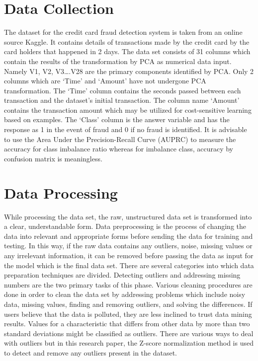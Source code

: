 \section{Data Collection}
The dataset for the credit card fraud detection system is taken from an online source Kaggle. It contains details of transactions made by the credit card by the card holders that happened in 2 days. The data set consists of 31 columns which contain the results of the transformation by PCA as numerical data input. Namely V1, V2, V3….V28 are the primary components identified by PCA. Only 2 columns which are ‘Time’ and ‘Amount’ have not undergone PCA transformation. The ‘Time’ column contains the seconds passed between each transaction and the dataset’s initial transaction. The column name ‘Amount’ contains the transaction amount which may be utilized for cost-sensitive learning based on examples. The ‘Class’ column is the answer variable and has the response as 1 in the event of fraud and 0 if no fraud is identified. It is advisable to use the Area Under the Precision-Recall Curve (AUPRC) to measure the accuracy for class imbalance ratio whereas for imbalance class, accuracy by confusion matrix is meaningless.

\section{Data Processing}
While processing the data set, the raw, unstructured data set is transformed into a clear, understandable form. Data preprocessing is the process of changing the data into relevant and appropriate forms before sending the data for training and testing. In this way, if the raw data contains any outliers, noise, missing values or any irrelevant information, it can be removed before passing the data as input for the model which is the final data set. There are several categories into which data preparation techniques are divided. Detecting outliers and addressing missing numbers are the two primary tasks of this phase. Various cleaning procedures are done in order to clean the data set by addressing problems which include noisy data, missing values, finding and removing outliers, and solving the differences. If users believe that the data is polluted, they are less inclined to trust data mining results. Values for a characteristic that differs from other data by more than two standard deviations might be classified as outliers. There are various ways to deal with outliers but in this research paper, the Z-score normalization method is used to detect and remove any outliers present in the dataset.


